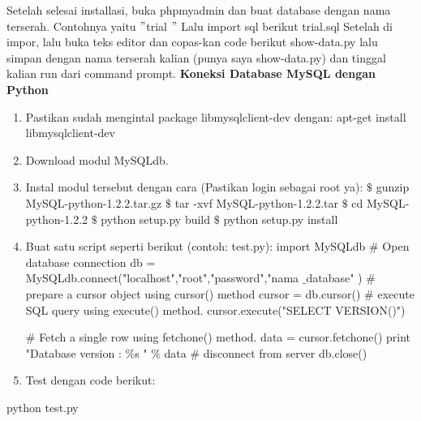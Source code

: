Setelah selesai installasi, buka phpmyadmin dan buat database dengan nama terserah. Contohnya yaitu  $ " $trial $ " $ Lalu import sql berikut 
\noindent 
trial.sql 
\noindent 
Setelah di impor, lalu buka teks editor dan copas-kan code berikut 
\noindent 
show-data.py
\noindent 
lalu simpan dengan nama terserah kalian (punya saya show-data.py) dan tinggal kalian run dari command prompt.
\vspace{12pt}
\noindent 
\textbf{Koneksi Database MySQL dengan Python} 
\noindent 
\begin{enumerate}
\item Pastikan sudah mengintal package libmysqlclient-dev dengan: 
apt-get install libmysqlclient-dev 
\noindent 
\item Download modul MySQLdb. 
\noindent 
\item Instal modul tersebut dengan cara (Pastikan login sebagai root ya): 
 $  \$  $ gunzip MySQL-python-1.2.2.tar.gz 
 $  \$  $ tar -xvf MySQL-python-1.2.2.tar 
 $  \$  $ cd MySQL-python-1.2.2 
 $  \$  $ python setup.py build 
 $  \$  $ python setup.py install 
\noindent 
\item Buat satu script seperti berikut (contoh: test.py): 
import MySQLdb 
 $  \#  $ Open database connection 
db = MySQLdb.connect("localhost","root","password","nama $  \_  $database" ) 
 $  \#  $ prepare a cursor object using cursor() method 
cursor = db.cursor()
 $  \#  $ execute SQL query using execute() method. 
cursor.execute("SELECT VERSION()") \par
 $  \#  $ Fetch a single row using fetchone() method. 
data = cursor.fetchone() 
print "Database version :  $  \%  $s "  $  \%  $ data
 $  \#  $ disconnect from server
db.close()
\noindent 
\item Test dengan code berikut:\end{enumerate}
 \par
python test.py 
\vspace{12pt}
